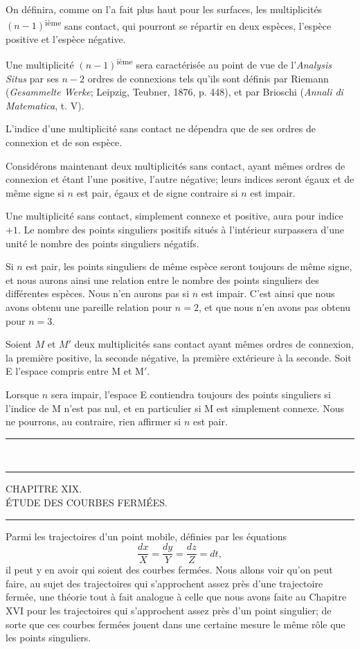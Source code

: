 \documentclass[11pt]{article}
\newcommand{\ornament}{\begin{center}\rule{2.5em}{0.4pt}\,\raisebox{0.1ex}{\tiny$\bullet\bullet\bullet$}\,\rule{2.5em}{0.4pt}\end{center}}
\newcommand{\shortline}{\begin{center}\rule{3.5em}{0.4pt}\end{center}}
\begin{document}
On définira, comme on l’a fait plus haut pour les surfaces, les multiplicités $(n-1)$\textsuperscript{ième} sans contact, qui pourront se répartir en deux espèces, l’espèce positive et l’espèce négative.

Une multiplicité $(n-1)$\textsuperscript{ième} sera caractérisée au point de vue de l’\emph{Analysis Situs} par ses $n-2$ ordres de connexions tels qu’ils sont définis par Riemann (\emph{Gesammelte Werke}; Leipzig, Teubner, 1876, p. 448), et par Brioschi (\emph{Annali di Matematica}, t. V).

L’indice d’une multiplicité sans contact ne dépendra que de ses ordres de connexion et de son espèce.

Considérons maintenant deux multiplicités sans contact, ayant mêmes ordres de connexion et étant l’une positive, l’autre négative; leurs indices seront égaux et de même signe si $n$ est pair, égaux et de signe contraire si $n$ est impair.

Une multiplicité sans contact, simplement connexe et positive, aura pour indice $+1$. Le nombre des points singuliers positifs situés à l’intérieur surpassera d’une unité le nombre des points singuliers négatifs.

Si $n$ est pair, les points singuliers de même espèce seront toujours de même signe, et nous aurons ainsi une relation entre le nombre des points singuliers des différentes espèces. Nous n’en aurons pas si $n$ est impair. C’est ainsi que nous avons obtenu une pareille relation pour $n=2$, et que nous n’en avons pas obtenu pour $n=3$.

Soient $M$ et $M'$ deux multiplicités sans contact ayant mêmes ordres de connexion, la première positive, la seconde négative, la première extérieure à la seconde. Soit E l’espace compris entre M et M$'$.

Lorsque $n$ sera impair, l’espace E contiendra toujours des points singuliers si l’indice de M n’est pas nul, et en particulier si M est simplement connexe. Nous ne pourrons, au contraire, rien affirmer si $n$ est pair.

\ornament

\clearpage
\begin{center}
{\Large CHAPITRE XIX.}\\[0.6em]
{\large ÉTUDE DES COURBES FERMÉES.}
\end{center}
\shortline

Parmi les trajectoires d’un point mobile, définies par les équations
\[
\frac{dx}{X}=\frac{dy}{Y}=\frac{dz}{Z}=dt,
\]
il peut y en avoir qui soient des courbes fermées. Nous allons voir qu’on peut faire, au sujet des trajectoires qui s’approchent assez près d’une trajectoire fermée, une théorie tout à fait analogue à celle que nous avons faite au Chapitre XVI pour les trajectoires qui s’approchent assez près d’un point singulier; de sorte que ces courbes fermées jouent dans une certaine mesure le même rôle que les points singuliers.
\end{document}
